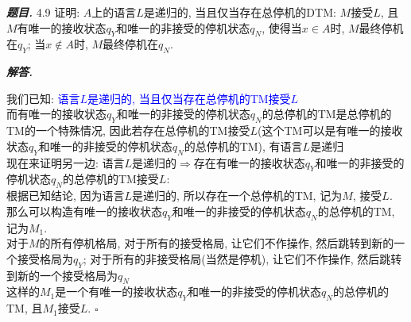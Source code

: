 \documentclass[10pt, a4paper, oneside]{ctexart}
\newenvironment{problem}{\begin{framed}\par\noindent\textbf{\textit{题目. }}}{\end{framed}\par}
\newenvironment{solution}{%
  \par\noindent\textbf{\textit{解答. }}\ignorespaces
}{%
  \hfill\ensuremath{\square}\par
}
\begin{document}
\begin{problem}
4.9 证明: $A$上的语言$L$是递归的, 当且仅当存在总停机的DTM: $M$接受$L$, 且$M$有唯一的接收状态$q_Y$和唯一的非接受的停机状态$q_N$, 使得当$x\in A$时, $M$最终停机在$q_Y$; 当$x\notin A$时, $M$最终停机在$q_N$.
\end{problem}
\begin{solution}
我们已知: \textcolor{blue}{语言$L$是递归的, 当且仅当存在总停机的TM接受$L$}\\
而有唯一的接收状态$q_Y$和唯一的非接受的停机状态$q_N$的总停机的TM是总停机的TM的一个特殊情况, 因此若存在总停机的TM接受$L$(这个TM可以是有唯一的接收状态$q_Y$和唯一的非接受的停机状态$q_N$的总停机的TM), 有语言$L$是递归\\
现在来证明另一边: 语言$L$是递归的$\Rightarrow$存在有唯一的接收状态$q_Y$和唯一的非接受的停机状态$q_N$的总停机的TM接受$L$:\\
根据已知结论, 因为语言$L$是递归的, 所以存在一个总停机的TM, 记为$M$, 接受$L$. 那么可以构造有唯一的接收状态$q_Y$和唯一的非接受的停机状态$q_N$的总停机的TM, 记为$M_1$.\\
对于$M$的所有停机格局, 对于所有的接受格局, 让它们不作操作, 然后跳转到新的一个接受格局为$q_Y$; 对于所有的非接受格局(当然是停机), 让它们不作操作, 然后跳转到新的一个接受格局为$q_N$\\
这样的$M_1$是一个有唯一的接收状态$q_Y$和唯一的非接受的停机状态$q_N$的总停机的TM, 且$M_1$接受$L$.
\end{solution}
\end{document}
